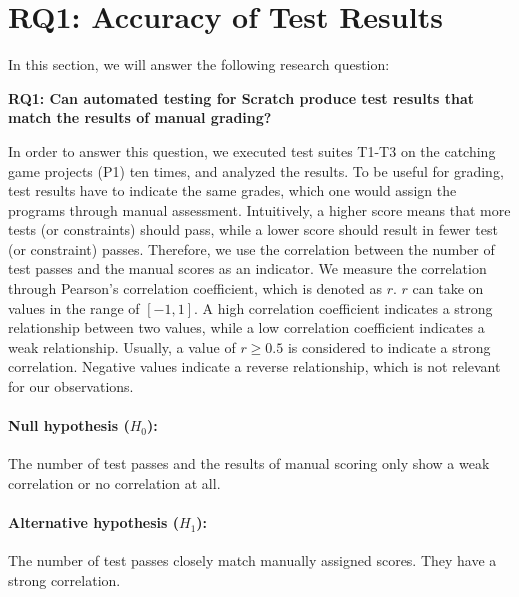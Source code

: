 \section{RQ1: Accuracy of Test Results}
\label{sec:rq1}

In this section, we will answer the following research question:

\begin{center}\begin{minipage}{.9\textwidth}
    \textbf{RQ1: Can automated testing for Scratch produce test results that match the results of manual grading?}
\end{minipage}\end{center}

\noindent In order to answer this question,
we executed test suites T1-T3 on the catching game projects (P1) ten times,
and analyzed the results.
To be useful for grading,
test results have to indicate the same grades,
which one would assign the programs through manual assessment.
Intuitively, a higher score means that more tests (or constraints) should pass,
while a lower score should result in fewer test (or constraint) passes.
Therefore, we use the correlation between the number of test passes and the manual scores as an indicator.
We measure the correlation through Pearson's correlation coefficient, which is denoted as $r$.
$r$ can take on values in the range of $[-1, 1]$.
A high correlation coefficient indicates a strong relationship between two values,
while a low correlation coefficient indicates a weak relationship.
Usually, a value of $r \ge 0.5$ is considered to indicate a strong correlation.
Negative values indicate a reverse relationship, which is not relevant for our observations.

\paragraph{Null hypothesis ($H_0$):}
The number of test passes and the results of manual scoring only show a weak correlation or no correlation at all.
\vspace{-\medskipamount}
\paragraph{Alternative hypothesis ($H_1$):}
The number of test passes closely match manually assigned scores.
They have a strong correlation.

